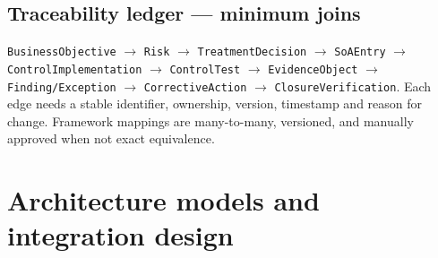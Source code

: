\documentclass[10pt,letterpaper]{article}
\begin{document}
\subsection{Traceability ledger --- minimum joins}
\begin{noteBox}
\raggedright\texttt{BusinessObjective} $\rightarrow$ \texttt{Risk} $\rightarrow$ \texttt{TreatmentDecision} $\rightarrow$ \texttt{SoAEntry} $\rightarrow$ \texttt{ControlImplementation} $\rightarrow$ \texttt{ControlTest} $\rightarrow$ \texttt{EvidenceObject} $\rightarrow$ \texttt{Finding/Exception} $\rightarrow$ \texttt{CorrectiveAction} $\rightarrow$ \texttt{ClosureVerification}. Each edge needs a stable identifier, ownership, version, timestamp and reason for change. Framework mappings are many-to-many, versioned, and manually approved when not exact equivalence.
\end{noteBox}

\section{Architecture models and integration design}
\end{document}

